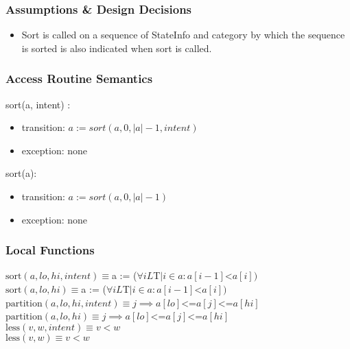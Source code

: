 \documentclass[12pt]{article}
\begin{document}
\subsubsection* {Assumptions \& Design Decisions}

\begin{itemize}
\item Sort is called on a sequence of StateInfo and category by which the sequence is sorted is also indicated when sort is called.
\end{itemize}

\subsubsection* {Access Routine Semantics}

\noindent sort(a, intent) :
\begin{itemize}
\item transition: $a := sort(a, 0, |a| - 1, intent)$
\item exception: none
\end{itemize}

\noindent sort(a):
\begin{itemize}
\item transition: $a := sort(a, 0, |a| - 1)$
\item exception: none
\end{itemize}

\subsubsection* {Local Functions}

\noindent
$\text{sort}(a, lo, hi, intent) \equiv $a := ($\forall i L $T$ | i \in a : a[i - 1]  $<$ a[i])  $ \\


\noindent
$\text{sort}(a, lo, hi) \equiv $a := ($\forall i L $T$ | i \in a : a[i - 1]  $<$ a[i])  $ \\

\noindent
$\text{partition}(a, lo, hi, intent) \equiv j \implies a[lo] $<=$ a[j] $<=$ a[hi]$ \\

\noindent
$\text{partition}(a, lo, hi) \equiv j \implies a[lo] $<=$ a[j] $<=$ a[hi]$ \\

\noindent
$\text{less}(v,  w, intent) \equiv v < w$ \\
\noindent
$\text{less}(v,  w) \equiv v < w$ \\
\end{document}
